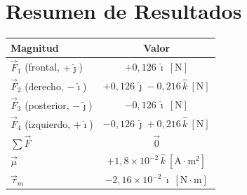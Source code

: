\documentclass[12pt,letterpaper]{article}
\begin{document}
\section*{Resumen de Resultados}

\begin{center}
\renewcommand{\arraystretch}{1.2}
\begin{tabular}{|l|c|}
\hline
\textbf{Magnitud} & \textbf{Valor} \\
\hline
$\vec{F}_1$ (frontal, $+\hat{\jmath}$)   & $+0{,}126\,\hat{\imath}\ [\text{N}]$ \\
$\vec{F}_2$ (derecho, $-\hat{\imath}$)   & $+0{,}126\,\hat{\jmath}-0{,}216\,\hat{k}\ [\text{N}]$ \\
$\vec{F}_3$ (posterior, $-\hat{\jmath}$) & $-0{,}126\,\hat{\imath}\ [\text{N}]$ \\
$\vec{F}_4$ (izquierdo, $+\hat{\imath}$) & $-0{,}126\,\hat{\jmath}+0{,}216\,\hat{k}\ [\text{N}]$ \\
$\sum\vec{F}$ & $\vec{0}$ \\
\hline
$\vec{\mu}$   & $+1{,}8\times10^{-2}\,\hat{k}\ [\text{A}\cdot\text{m}^2]$ \\
$\vec{\tau}_m$ & $-2{,}16\times10^{-2}\,\hat{\imath}\ [\text{N}\cdot\text{m}]$ \\
\hline
\end{tabular}
\end{center}
\end{document}
